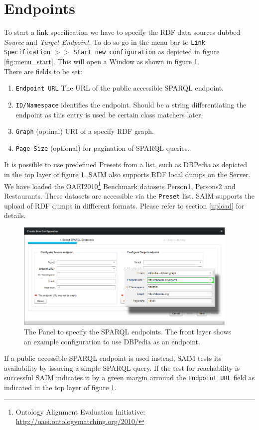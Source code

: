 \documentclass[oneside,a4paper,12pt]{memoir}
\begin{document}
	\section{Endpoints}
	\label{endpoint}
	To start a link specification we have to specify the RDF data sources dubbed \textit{Source} and \textit{Target Endpoint}. To do so go in the menu bar to \texttt{Link Specification} $>>$ \texttt{Start new configuration} as depicted in figure \ref{fig:menu_start}. This will open a Window as shown in figure \ref{fig:endpoint}. \\
	There are fields to be set:
	\begin{enumerate}
		\item \texttt{Endpoint URL} The URL of the public accessible SPARQL endpoint.
		\item \texttt{ID/Namespace} identifies the endpoint. Should be a string differentiating the endpoint as this entry is used be certain class matchers later.
		\item \texttt{Graph} (optinal) URI of a specify RDF graph.
		\item \texttt{Page Size} (optional) for pagination of SPARQL queries.
	\end{enumerate}
	It is possible to use predefined Presets from a list, such as DBPedia as depicted in the top layer of figure \ref{fig:endpoint}. SAIM also supports RDF local dumps on the Server. We have loaded the OAEI2010\footnote{Ontology Alignment Evaluation Initiative: \url{http://oaei.ontologymatching.org/2010/}} Benchmark datasets Person1, Persons2 and Restaurants. These datasets are accessible via the \texttt{Preset} list. SAIM supports the upload of RDF dumps in diffferent formats. Please refer to section \ref{upload} for details.\\
	\begin{figure}[!h]
		\centering
		\includegraphics[width=0.95\textwidth]{images/endpoint.png}
		\caption{The Panel to specify the SPARQL endpoints. The front layer shows an example configuration to use DBPedia as an endpoint.}
		\label{fig:endpoint}
	\end{figure}
If a public accessible SPARQL endpoint is used instead, SAIM tests its availability by issueing a simple SPARQL query. If the test for reachability is successful SAIM indicates it by a green margin arround the \texttt{Endpoint URL} field as indicated in the top layer of figure \ref{fig:endpoint}.
\end{document}
